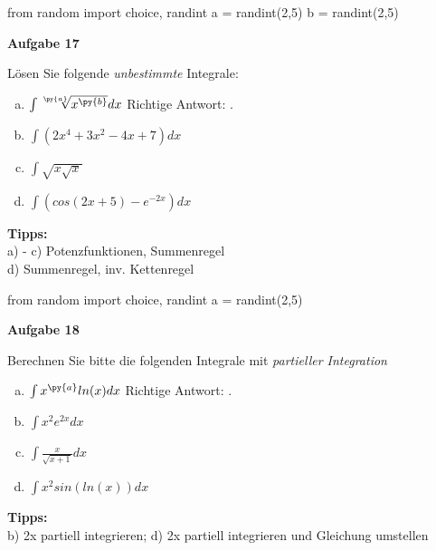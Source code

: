 \documentclass[a4paper,12pt]{article}
\newcommand{\Aufgabe}[1]{
	{
		\vspace*{0.5cm}
		\textsf{\textbf{Aufgabe #1}}
		\vspace*{0.2cm}
		
	}
}
\begin{document}
\begin{pycode}
from random import choice, randint
a = randint(2,5)
b = randint(2,5)
\end{pycode}

\Aufgabe{17}
Lösen Sie folgende \textit{unbestimmte} Integrale:
\begin{multicols}{2}
	\begin{enumerate}[a)]
		\item $\int  \sqrt[\py{a}]{x^\py{b}}dx$
		\ifnum{} 
		\newline Richtige Antwort: .
		\fi 
		\item $\int  (2x^4+3x^2-4x+7)dx$
		\item $\int  \sqrt{x \sqrt{x}}$
		\item $\int  (cos(2x+5)- e^{-2x})dx$
		
		
	\end{enumerate}
\end{multicols}
\textbf{Tipps:}\\
a) - c) Potenzfunktionen, Summenregel\\
d) Summenregel, inv. Kettenregel\\

\begin{pycode}
from random import choice, randint
a = randint(2,5)
\end{pycode}

\Aufgabe{18}
Berechnen Sie bitte die folgenden Integrale mit \textit{partieller Integration}
\begin{multicols}{2}
	\begin{enumerate}[a)]
		\item $\int  x^{\py{a}} ln(x)dx$
		\ifnum{} 
		\newline Richtige Antwort: .
		\fi 
		\item $\int  x^2 e^{2x}dx$
		\item $\int  \frac{x}{\sqrt{x+1}} dx$
		\item $\int  x^2 sin(ln(x))dx$
		
	\end{enumerate}
\end{multicols}
\textbf{Tipps:}\\
b) 2x partiell integrieren; d) 2x partiell integrieren und Gleichung umstellen
\end{document}
